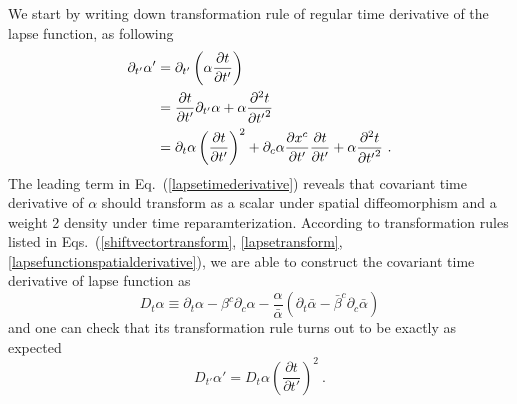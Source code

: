 We start by writing down transformation rule of regular time derivative of the lapse function, as following
\begin{align}\label{lapsetimederivative}
\partial_{t'}\alpha' & = \partial_{t'}\left(\alpha\frac{\partial t}{\partial t'}\right)\notag\\
& = \frac{\partial t}{\partial t'}\partial_{t'}\alpha + \alpha\frac{\partial^{2}t}{\partial {t'}^{2}}\notag\\
& = \partial_{t}\alpha\left(\frac{\partial t}{\partial t'}\right)^{2} + \partial_{c}\alpha\frac{\partial x^{c}}{\partial t'}\frac{\partial t}{\partial t'} + \alpha\frac{\partial^{2}t}{\partial {t'}^{2}} \ .
\end{align}
The leading term in Eq.~(\ref{lapsetimederivative}) reveals that covariant time derivative of $\alpha$ should transform as a scalar under spatial diffeomorphism and a weight 2 density under time reparamterization. According to transformation rules listed in Eqs.~(\ref{shiftvectortransform}, \ref{lapsetransform}, \ref{lapsefunctionspatialderivative}), we are able to construct the covariant time derivative of lapse function as
\begin{equation}\label{lapsecovarianttimederivative}
	D_{t}\alpha \equiv \partial_{t}\alpha - \beta^{c}\partial_{c}\alpha - \frac{\alpha}{{\bar \alpha}}\left(\partial_{t}{\bar \alpha} - {\bar \beta}^{c}\partial_{c}{\bar \alpha}\right) 
\end{equation}
and one can check that its transformation rule turns out to be exactly as expected
\begin{equation}
	D_{t'}\alpha' = D_{t}\alpha \left(\frac{\partial t}{\partial t'}\right)^{2} \ .
\end{equation}

